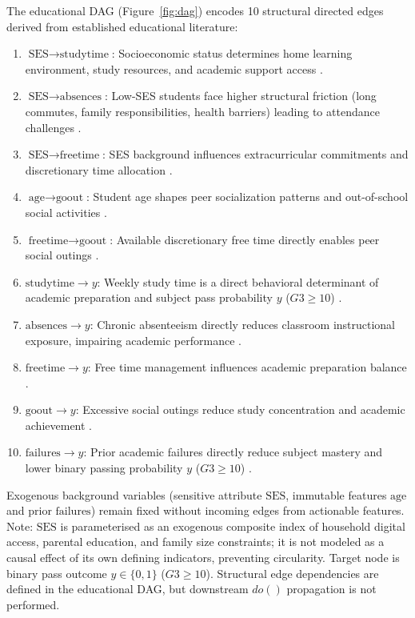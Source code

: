 \documentclass[11pt]{article}
\begin{document}
The educational DAG (Figure~\ref{fig:dag}) encodes 10 structural directed edges derived from established educational literature:
\begin{enumerate}
    \item $\text{SES} \to \text{studytime}$: Socioeconomic status determines home learning environment, study resources, and academic support access \cite{Sirin2005}.
    \item $\text{SES} \to \text{absences}$: Low-SES students face higher structural friction (long commutes, family responsibilities, health barriers) leading to attendance challenges \cite{OECD2018}.
    \item $\text{SES} \to \text{freetime}$: SES background influences extracurricular commitments and discretionary time allocation \cite{Sirin2005}.
    \item $\text{age} \to \text{goout}$: Student age shapes peer socialization patterns and out-of-school social activities \cite{Castro2015}.
    \item $\text{freetime} \to \text{goout}$: Available discretionary free time directly enables peer social outings \cite{Castro2015}.
    \item $\text{studytime} \to y$: Weekly study time is a direct behavioral determinant of academic preparation and subject pass probability $y$ ($G3 \ge 10$) \cite{Plant2005,Nonis2010}.
    \item $\text{absences} \to y$: Chronic absenteeism directly reduces classroom instructional exposure, impairing academic performance \cite{Gottfried2014,Gershenson2019}.
    \item $\text{freetime} \to y$: Free time management influences academic preparation balance \cite{Nonis2010}.
    \item $\text{goout} \to y$: Excessive social outings reduce study concentration and academic achievement \cite{Plant2005}.
    \item $\text{failures} \to y$: Prior academic failures directly reduce subject mastery and lower binary passing probability $y$ ($G3 \ge 10$) \cite{CortezSilva2008}.
\end{enumerate}

Exogenous background variables (sensitive attribute $\text{SES}$, immutable features $\text{age}$ and prior $\text{failures}$) remain fixed without incoming edges from actionable features. Note: $\text{SES}$ is parameterised as an exogenous composite index of household digital access, parental education, and family size constraints; it is not modeled as a causal effect of its own defining indicators, preventing circularity. Target node is binary pass outcome $y \in \{0,1\}$ ($G3 \ge 10$). Structural edge dependencies are defined in the educational DAG, but downstream $do()$ propagation is not performed.
\end{document}
